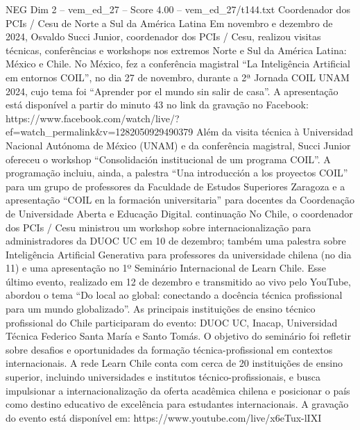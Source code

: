 \begin{textsample}{NEG Dim 2 – vem\_ed\_27 – Score 4.00 – vem\_ed\_27/t144.txt}  \label{ex:f2_neg_169}
Coordenador dos PCIs / Cesu de Norte a Sul da América Latina Em novembro e dezembro de 2024, Osvaldo Succi Junior, coordenador dos PCIs / Cesu, realizou visitas técnicas, conferências e workshops nos extremos Norte e Sul da América Latina: México e Chile.
No México, fez a conferência magistral “La Inteligência Artificial em entornos COIL”, no dia 27 de novembro, durante a 2ª Jornada COIL UNAM 2024, cujo tema foi “Aprender por el mundo sin salir de casa”.
A apresentação está disponível a partir do minuto 43 no link da gravação no Facebook: https://www.facebook.com/watch/live/?ef=watch\_permalink\&v=1282050929490379 Além da visita técnica à Universidad Nacional Autónoma de México (UNAM) e da conferência magistral, Succi Junior ofereceu o workshop “Consolidación institucional de um programa COIL”.
A programação incluiu, ainda, a palestra “Una introducción a los proyectos COIL” para um grupo de professores da Faculdade de Estudos Superiores Zaragoza e a apresentação “COIL en la formación universitaria” para docentes da Coordenação de Universidade Aberta e Educação Digital. continuação No Chile, o coordenador dos PCIs / Cesu ministrou um workshop sobre internacionalização para administradores da DUOC UC em 10 de dezembro; também uma palestra sobre Inteligência Artificial Generativa para professores da universidade chilena (no dia 11) e uma apresentação no 1º Seminário Internacional de Learn Chile.
Esse último evento, realizado em 12 de dezembro e transmitido ao vivo pelo YouTube, abordou o tema “Do local ao global: conectando a docência técnica profissional para um mundo globalizado”.
As principais instituições de ensino técnico profissional do Chile participaram do evento: DUOC UC, Inacap, Universidad Técnica Federico Santa María e Santo Tomás.
O objetivo do seminário foi refletir sobre desafios e oportunidades da formação técnica-profissional em contextos internacionais.
A rede Learn Chile conta com cerca de 20 instituições de ensino superior, incluindo universidades e institutos técnico-profissionais, e busca impulsionar a internacionalização da oferta acadêmica chilena e posicionar o país como destino educativo de excelência para estudantes internacionais.
A gravação do evento está disponível em: https://www.youtube.com/live/x6eTux-lIXI

\end{textsample}
